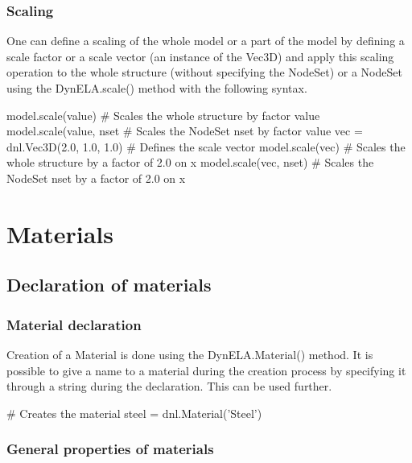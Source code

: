 \subsubsection{Scaling}

One can define a scaling of the whole model or a part of the model by defining a scale factor or a scale vector (an instance of the \DynELA \textsf{Vec3D}) and apply this scaling operation to the whole structure (without specifying the \textsf{NodeSet}) or a \textsf{NodeSet} using the \textsf{DynELA.scale()} method with the following syntax.

\begin{PythonListing}
model.scale(value)             # Scales the whole structure by factor value
model.scale(value, nset        # Scales the NodeSet nset by factor value
vec = dnl.Vec3D(2.0, 1.0, 1.0) # Defines the scale vector
model.scale(vec)               # Scales the whole structure by a factor of 2.0 on x
model.scale(vec, nset)         # Scales the NodeSet nset by a factor of 2.0 on x
\end{PythonListing}

\section{Materials}

\subsection{Declaration of materials}

\subsubsection{Material declaration}

Creation of a Material is done using the \textsf{DynELA.Material()} method. It is possible to give a name to a material during the creation process by specifying it through a string during the declaration. This can be used further.

\begin{PythonListing}
# Creates the material
steel = dnl.Material('Steel')
\end{PythonListing}

\subsubsection{General properties of materials}

